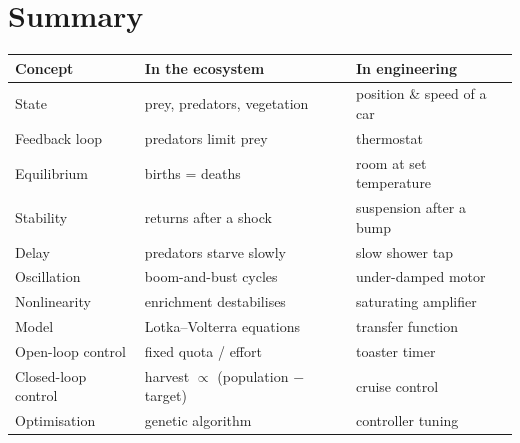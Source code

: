 \documentclass[11pt,a4paper]{article}
\begin{document}
\section{Summary}
\begin{center}
\begin{tabular}{p{3.4cm}p{6.2cm}p{5cm}}
\toprule
\textbf{Concept} & \textbf{In the ecosystem} & \textbf{In engineering} \\
\midrule
State & prey, predators, vegetation & position \& speed of a car \\
Feedback loop & predators limit prey & thermostat \\
Equilibrium & births = deaths & room at set temperature \\
Stability & returns after a shock & suspension after a bump \\
Delay & predators starve slowly & slow shower tap \\
Oscillation & boom-and-bust cycles & under-damped motor \\
Nonlinearity & enrichment destabilises & saturating amplifier \\
Model & Lotka--Volterra equations & transfer function \\
Open-loop control & fixed quota / effort & toaster timer \\
Closed-loop control & harvest $\propto$ (population $-$ target) & cruise control \\
Optimisation & genetic algorithm & controller tuning \\
\bottomrule
\end{tabular}
\end{center}

\end{document}
